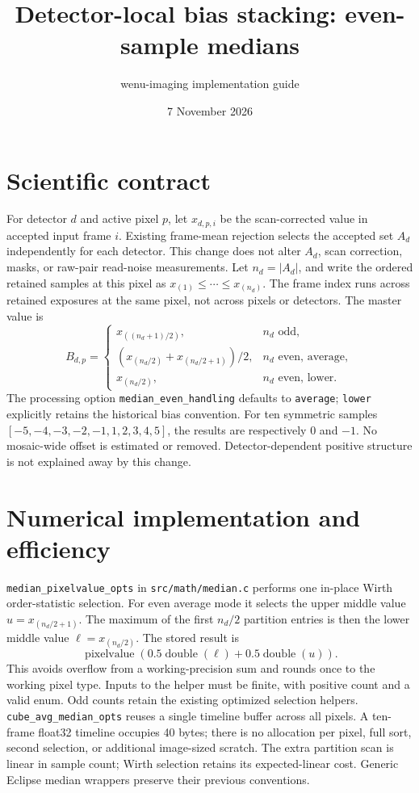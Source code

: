 \documentclass[11pt]{article}
\title{Detector-local bias stacking: even-sample medians}
\author{wenu-imaging implementation guide}
\date{7 November 2026}
\begin{document}
\maketitle
\section{Scientific contract}
For detector $d$ and active pixel $p$, let $x_{d,p,i}$ be the scan-corrected
value in accepted input frame $i$. Existing frame-mean rejection selects the
accepted set $A_d$ independently for each detector. This change does not alter
$A_d$, scan correction, masks, or raw-pair read-noise measurements.
Let $n_d=|A_d|$, and write the ordered retained samples at this pixel as
$x_{(1)}\leq\cdots\leq x_{(n_d)}$. The frame index runs across retained
exposures at the same pixel, not across pixels or detectors.
The master value is
\[
 B_{d,p}=\begin{cases}
 x_{((n_d+1)/2)},&n_d\text{ odd},\\
 (x_{(n_d/2)}+x_{(n_d/2+1)})/2,&n_d\text{ even, average},\\
 x_{(n_d/2)},&n_d\text{ even, lower}.
 \end{cases}
\]
The processing option \texttt{median\_even\_handling} defaults to
\texttt{average}; \texttt{lower} explicitly retains the historical bias
convention. For ten symmetric samples $[-5,-4,-3,-2,-1,1,2,3,4,5]$, the
results are respectively $0$ and $-1$. No mosaic-wide offset is estimated
or removed. Detector-dependent positive structure is not explained away by
this change.
\section{Numerical implementation and efficiency}
\texttt{median\_pixelvalue\_opts} in \texttt{src/math/median.c} performs
one in-place Wirth order-statistic selection. For even average mode it selects
the upper middle value $u=x_{(n_d/2+1)}$. The maximum of the first $n_d/2$
partition entries is then the lower middle value $\ell=x_{(n_d/2)}$.
The stored result is
\[
 \operatorname{pixelvalue}\!\left(0.5\operatorname{double}(\ell)
                         +0.5\operatorname{double}(u)\right).
\]
This avoids overflow from a working-precision sum and rounds once to the
working pixel type. Inputs to the helper must be finite, with positive count
and a valid enum. Odd counts retain the existing optimized selection helpers.
\texttt{cube\_avg\_median\_opts} reuses a single timeline buffer across all
pixels. A ten-frame float32 timeline occupies 40 bytes; there is no allocation
per pixel, full sort, second selection, or additional image-sized scratch.
The extra partition scan is linear in sample count; Wirth selection retains its expected-linear cost.
Generic Eclipse median wrappers preserve their previous conventions.
\end{document}
